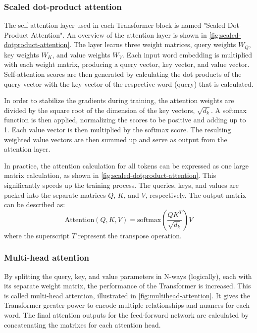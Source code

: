 \subsubsection{Scaled dot-product attention} 
\label{sec:scaled-dot-product-attention}
The self-attention layer used in each Transformer block is named "Scaled Dot-Product Attention". An overview of the attention layer is shown in \cref{fig:scaled-dotproduct-attention}. The layer learns three weight matrices, query weights \(W_Q\), key weights \(W_K\), and value weights \(W_V\). Each input word embedding is multiplied with each weight matrix, producing a query vector, key vector, and value vector. Self-attention scores are then generated by calculating the dot products of the query vector with the key vector of the respective word (query) that is calculated.

In order to stabilize the gradients during training, the attention weights are divided by the square root of the dimension of the key vectors, \(\sqrt{d_{k}}\). A softmax function is then applied, normalizing the scores to be positive and adding up to 1. Each value vector is then multiplied by the softmax score. The resulting weighted value vectors are then summed up and serve as output from the attention layer.

In practice, the attention calculation for all tokens can be expressed as one large matrix calculation, as shown in \cref{fig:scaled-dotproduct-attention}. This significantly speeds up the training process. The queries, keys, and values are packed into the separate matrices \(Q\), \(K\), and \(V\), respectively. The output matrix can be described as:
\begin{equation}
    \text{Attention$(Q,K,V)$} = \text{softmax}(\frac{QK^T}{\sqrt{d_{k}}})V
\end{equation}
where the superscript \(T\) represent the transpose operation.

\subsubsection{Multi-head attention}
\label{sec:multi-head-attention}
By splitting the query, key, and value parameters in N-ways (logically), each with its separate weight matrix, the performance of the Transformer is increased. This is called multi-head attention, illustrated in \cref{fig:multihead-attention}. It gives the Transformer greater power to encode multiple relationships and nuances for each word. The final attention outputs for the feed-forward network are calculated by concatenating the matrixes for each attention head.

